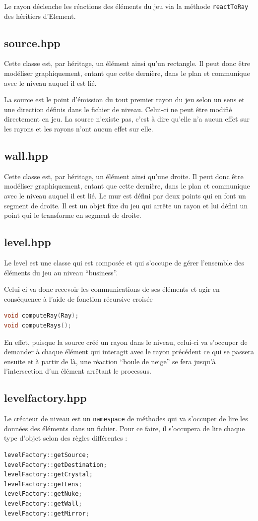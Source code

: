 \documentclass[a4paper,11pt]{report}
\begin{document}
Le rayon déclenche les réactions des éléments du jeu via la méthode
\texttt{reactToRay} des héritiers d'Element.

\subsection[Source]{source.hpp}
Cette classe est, par héritage, un élément ainsi qu'un rectangle. Il peut donc
être modéliser graphiquement, entant que cette dernière, dans le plan et
communique avec le niveau auquel il est lié. 

La source est le point d'émission du tout premier rayon du jeu selon un sens 
et une direction définis dans le fichier de niveau. Celui-ci ne peut être
modifié directement en jeu. La source n'existe pas, c'est à dire qu'elle n'a
aucun effet sur les rayons et les rayons n'ont aucun effet sur elle.

\subsection[Mur]{wall.hpp}
Cette classe est, par héritage, un élément ainsi qu'une droite. Il peut donc
être modéliser graphiquement, entant que cette dernière, dans le plan et
communique avec le niveau auquel il est lié. Le mur est défini par deux points
qui en font un segment de droite. Il est un objet fixe du jeu qui arrête un
rayon et lui défini un point qui le transforme en segment de droite.

\subsection[Niveau]{level.hpp}
Le level est une classe qui est composée et qui s'occupe de gérer l'ensemble des
éléments du jeu au niveau ``business''.

Celui-ci va donc recevoir les communications de ses éléments et agir en
conséquence à l'aide de fonction récursive croisée 
\begin{lstlisting}[language=C++]
void computeRay(Ray);
void computeRays();
\end{lstlisting}

En effet, puisque la source créé un rayon dans le niveau, celui-ci va s'occuper
de demander à chaque élément qui interagit avec le rayon précédent ce qui se
passera ensuite et à partir de là, une réaction ``boule de neige'' se fera
jusqu'à l'intersection d'un élément arrêtant le processus.
\subsection[Createur de niveau]{levelfactory.hpp}
Le créateur de niveau est un \texttt{namespace} de méthodes qui va s'occuper de lire
les données des éléments dans un fichier. 
Pour ce faire, il s'occupera de lire chaque type d'objet selon des règles
différentes :
\begin{lstlisting}[frame=single,language=C++]
levelFactory::getSource;
levelFactory::getDestination;
levelFactory::getCrystal;
levelFactory::getLens;
levelFactory::getNuke;
levelFactory::getWall;
levelFactory::getMirror;
\end{lstlisting}
\end{document}
